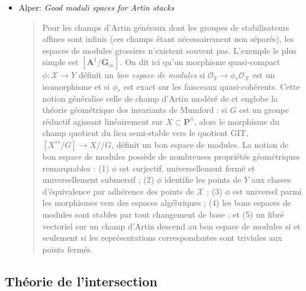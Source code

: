 \begin{itemize}
\begin{quote}
localement pour la topologie étale sur l'espace de
modules grossier, $\mathcal{X}$ est le quotient d'un schéma affine par un schéma
en groupes linéairement réductif. L'espace de modules grossier d'un champ
d'Artin modéré possède des propriétés particulièrement favorables.
Ainsi, sa formation commute à tout changement de base, tandis que
la formation de l'espace de modules grossier d'un champ d'Artin à inertie finie
ne commute en général qu'aux changements de base plats.
\end{quote}
\item Alper: \emph{Good moduli spaces for Artin stacks} \cite{alper_good}
\begin{quote}
Pour les champs d'Artin généraux dont les groupes de stabilisateurs affines sont
infinis (ces champs étant nécessairement non séparés), les espaces de modules
grossiers n'existent souvent pas. L'exemple le plus simple est
$[\mathbf{A}^1 / \mathbf{G}_m]$. On dit ici qu'un morphisme quasi-compact
$\phi : \mathcal{X} \to Y$ définit un \emph{bon espace de modules} si
$\mathcal{O}_Y \to \phi_*
\mathcal{O}_\mathcal{X}$ est un isomorphisme et si $\phi_*$ est exact sur les
faisceaux quasi-cohérents.
Cette notion généralise celle de champ d'Artin modéré de \cite{tame} et
englobe la théorie géométrique des invariants de Mumford : si $G$ est un groupe
réductif agissant linéairement sur $X \subset \mathbf{P}^n$, alors le morphisme
du champ quotient du lieu semi-stable vers le quotient GIT,
$[X^{ss}/G] \to X//G$, définit un bon espace de modules. La notion de bon
espace de modules possède de nombreuses propriétés géométriques remarquables :
(1) $\phi$ est surjectif, universellement fermé et universellement
submersif ; (2) $\phi$ identifie les points de $Y$ aux classes d'équivalence
par adhérence des points de $\mathcal{X}$ ; (3) $\phi$ est universel parmi les
morphismes vers des espaces algébriques ; (4)
les bons espaces de modules sont stables par tout changement de base ; et (5)
un fibré vectoriel sur un champ d'Artin descend au bon espace de modules si et
seulement si les représentations correspondantes sont triviales aux points
fermés.
\end{quote}
\end{itemize}


\subsection{Théorie de l'intersection}
\label{subsection-intersection-theory}


